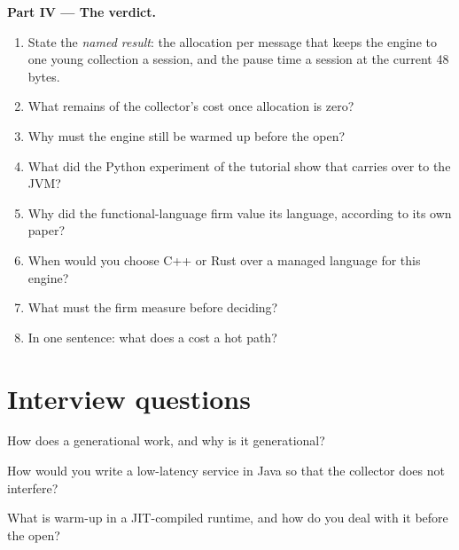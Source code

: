 \begin{problem}
\medskip\noindent\textbf{Part IV --- The verdict.}
\begin{enumerate}[resume]
\item State the \emph{named result}: the allocation per message that keeps the engine to one young collection a session,
and the pause time a session at the current 48 bytes.
\item What remains of the collector's cost once allocation is zero?
\item Why must the engine still be warmed up before the open?
\item What did the Python experiment of the tutorial show that carries over to the JVM?
\item Why did the functional-language firm value its language, according to its own paper?
\item When would you choose C++ or Rust over a managed language for this engine?
\item What must the firm measure before deciding?
\item In one sentence: what does a  cost a hot path?
\end{enumerate}
\end{problem}

\section{Interview questions}

\begin{interviewq}\label{iq:ll:managed-and-functional-languages-on-the-desk:1}
How does a generational  work, and why is it generational?
\end{interviewq}

\begin{interviewq}\label{iq:ll:managed-and-functional-languages-on-the-desk:2}
How would you write a low-latency service in Java so that the collector does not interfere?
\end{interviewq}

\begin{interviewq}\label{iq:ll:managed-and-functional-languages-on-the-desk:3}
What is warm-up in a JIT-compiled runtime, and how do you deal with it before the open?
\end{interviewq}

